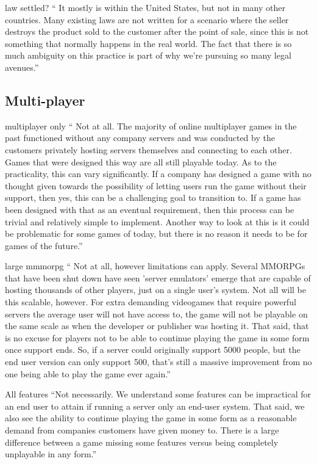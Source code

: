 law settled?
`` It mostly is within the United States, but not in many other countries.
Many existing laws are not written for a scenario where the seller destroys the product sold to the customer after the point of sale,
since this is not something that normally happens in the real world.
The fact that there is so much ambiguity on this practice is part of why we're pursuing so many legal avenues.''


\subsection{Multi-player}
multiplayer only
`` Not at all.
The majority of online multiplayer games in the past functioned without any company servers
and was conducted by the customers privately hosting servers themselves and connecting to each other.
Games that were designed this way are all still playable today.
As to the practicality, this can vary significantly.
If a company has designed a game with no thought given towards the possibility of letting users run the game without their support, then yes,
this can be a challenging goal to transition to.
If a game has been designed with that as an eventual requirement, then this process can be trivial and relatively simple to implement.
Another way to look at this is it could be problematic for some games of today, but there is no reason it needs to be for games of the future.''

large mmmorpg
`` Not at all, however limitations can apply.
Several MMORPGs that have been shut down have seen 'server emulators' emerge that are capable of hosting thousands of other players, just on a single user's system.
Not all will be this scalable, however. For extra demanding videogames that require powerful servers the average user will not have access to,
the game will not be playable on the same scale as when the developer or publisher was hosting it.
That said, that is no excuse for players not to be able to continue playing the game in some form once support ends.
So, if a server could originally support 5000 people, but the end user version can only support 500,
that's still a massive improvement from no one being able to play the game ever again.''

All features
``Not necessarily. We understand some features can be impractical for an end user to attain if running a server only an end-user system.
That said, we also see the ability to continue playing the game in some form as a reasonable demand from companies customers have given money to.
There is a large difference between a game missing some features versus being completely unplayable in any form.''

